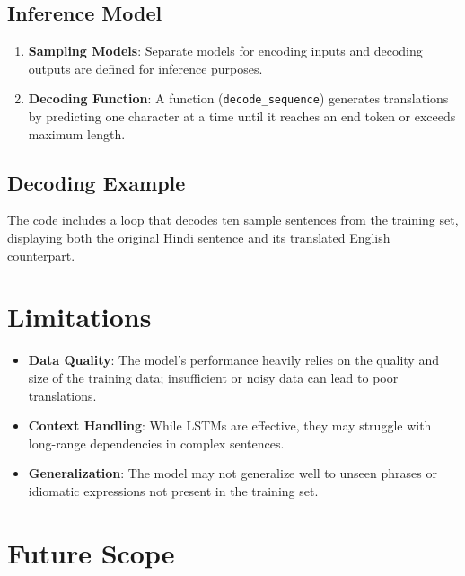 \documentclass{article}
\begin{document}
\subsection*{Inference Model}

\begin{enumerate}
    \item \textbf{Sampling Models}: 
    Separate models for encoding inputs and decoding outputs are defined for inference purposes.
    
    \item \textbf{Decoding Function}: 
    A function (\texttt{decode\_sequence}) generates translations by predicting one character at a time until it reaches an end token or exceeds maximum length.
\end{enumerate}

\subsection*{Decoding Example}

The code includes a loop that decodes ten sample sentences from the training set, displaying both the original Hindi sentence and its translated English counterpart.

\section{Limitations}

\begin{itemize}
    \item \textbf{Data Quality}: The model's performance heavily relies on the quality and size of the training data; insufficient or noisy data can lead to poor translations.
    
    \item \textbf{Context Handling}: While LSTMs are effective, they may struggle with long-range dependencies in complex sentences.
    
    \item \textbf{Generalization}: The model may not generalize well to unseen phrases or idiomatic expressions not present in the training set.
\end{itemize}

\section{Future Scope}
\end{document}
